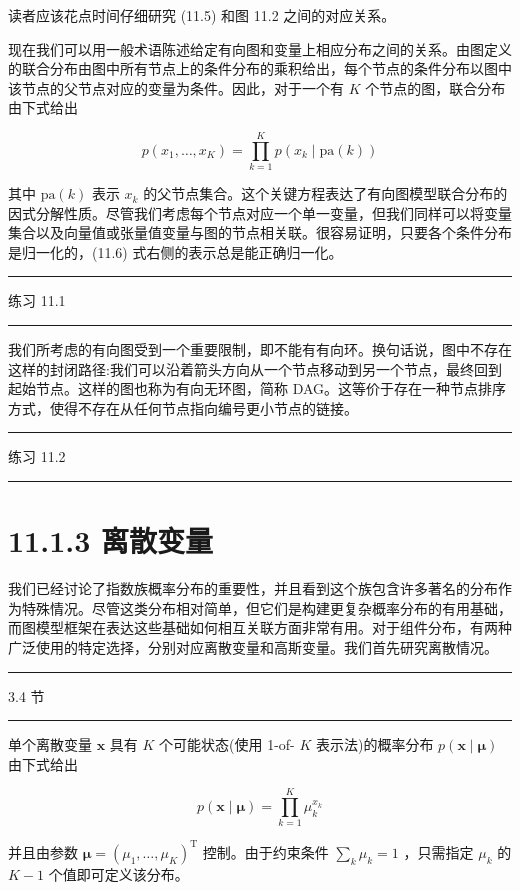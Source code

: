 \documentclass[10pt]{article}
\newcommand{\HRule}{\begin{center}\rule{0.9\linewidth}{0.2mm}\end{center}}
\begin{document}
读者应该花点时间仔细研究 (11.5) 和图 11.2 之间的对应关系。

现在我们可以用一般术语陈述给定有向图和变量上相应分布之间的关系。由图定义的联合分布由图中所有节点上的条件分布的乘积给出，每个节点的条件分布以图中该节点的父节点对应的变量为条件。因此，对于一个有 \(K\) 个节点的图，联合分布由下式给出

\[
p\left( {{x}_{1},\ldots ,{x}_{K}}\right)  = \mathop{\prod }\limits_{{k = 1}}^{K}p\left( {{x}_{k} \mid  \mathrm{{pa}}\left( k\right) }\right)  \tag{11.6}
\]

其中 \(\mathrm{{pa}}\left( k\right)\) 表示 \({x}_{k}\) 的父节点集合。这个关键方程表达了有向图模型联合分布的因式分解性质。尽管我们考虑每个节点对应一个单一变量，但我们同样可以将变量集合以及向量值或张量值变量与图的节点相关联。很容易证明，只要各个条件分布是归一化的，(11.6) 式右侧的表示总是能正确归一化。

\HRule

练习 11.1

\HRule

我们所考虑的有向图受到一个重要限制，即不能有有向环。换句话说，图中不存在这样的封闭路径:我们可以沿着箭头方向从一个节点移动到另一个节点，最终回到起始节点。这样的图也称为有向无环图，简称 DAG。这等价于存在一种节点排序方式，使得不存在从任何节点指向编号更小节点的链接。

\HRule

练习 11.2

\HRule

\section*{11.1.3 离散变量}

我们已经讨论了指数族概率分布的重要性，并且看到这个族包含许多著名的分布作为特殊情况。尽管这类分布相对简单，但它们是构建更复杂概率分布的有用基础，而图模型框架在表达这些基础如何相互关联方面非常有用。对于组件分布，有两种广泛使用的特定选择，分别对应离散变量和高斯变量。我们首先研究离散情况。

\HRule

3.4 节

\HRule

单个离散变量 \(\mathbf{x}\) 具有 \(K\) 个可能状态(使用 1-of- \(K\) 表示法)的概率分布 \(p\left( {\mathbf{x} \mid  \mathbf{\mu }}\right)\) 由下式给出

\[
p\left( {\mathbf{x} \mid  \mathbf{\mu }}\right)  = \mathop{\prod }\limits_{{k = 1}}^{K}{\mu }_{k}^{{x}_{k}} \tag{11.7}
\]

并且由参数 \(\mathbf{\mu } = {\left( {\mu }_{1},\ldots ,{\mu }_{K}\right) }^{\mathrm{T}}\) 控制。由于约束条件 \(\mathop{\sum }\limits_{k}{\mu }_{k} = 1\) ，只需指定 \({\mu }_{k}\) 的 \(K - 1\) 个值即可定义该分布。
\end{document}

